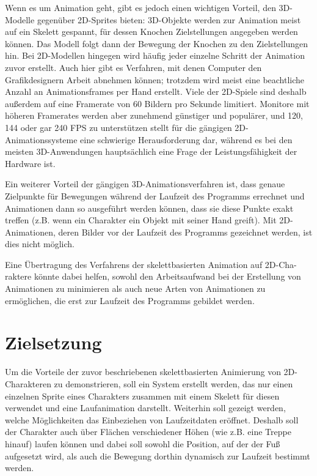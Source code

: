 Wenn es um Animation geht, gibt es jedoch einen wichtigen Vorteil, den 3D-Modelle gegenüber 2D-Sprites bieten: 3D-Objekte werden zur Animation meist auf ein Skelett gespannt, für dessen Knochen Zielstellungen angegeben werden können. Das Modell folgt dann der Bewegung der Knochen zu den Zielstellungen hin. Bei 2D-Modellen hingegen wird häufig jeder einzelne Schritt der Animation zuvor erstellt. Auch hier gibt es Verfahren, mit denen Computer den Grafikdesignern Arbeit abnehmen können; trotzdem wird meist eine beachtliche Anzahl an Animationsframes per Hand erstellt. Viele der 2D-Spiele sind deshalb außerdem auf eine Framerate von 60 Bildern pro Sekunde limitiert. Monitore mit höheren Framerates werden aber zunehmend günstiger und populärer, und 120, 144 oder gar 240 FPS zu unterstützen stellt für die gängigen 2D-Animationssysteme eine schwierige Herausforderung dar, während es bei den meisten 3D-Anwendungen hauptsächlich eine Frage der Leistungsfähigkeit der Hardware ist.

Ein weiterer Vorteil der gängigen 3D-Animationsverfahren ist, dass genaue Zielpunkte für Bewegungen während der Laufzeit des Programms errechnet und Animationen dann so ausgeführt werden können, dass sie diese Punkte exakt treffen (z.B. wenn ein Charakter ein Objekt mit seiner Hand greift). Mit 2D-Animationen, deren Bilder vor der Laufzeit des Programms gezeichnet werden, ist dies nicht möglich.

Eine Übertragung des Verfahrens der skelettbasierten Animation auf 2D-Cha-raktere könnte dabei helfen, sowohl den Arbeitsaufwand bei der Erstellung von Animationen zu minimieren als auch neue Arten von Animationen zu ermöglichen, die erst zur Laufzeit des Programms gebildet werden.

\section{Zielsetzung}
Um die Vorteile der zuvor beschriebenen skelettbasierten Animierung von 2D-Charakteren zu demonstrieren, soll ein System erstellt werden, das nur einen einzelnen Sprite eines Charakters zusammen mit einem Skelett für diesen verwendet und eine Laufanimation darstellt. Weiterhin soll gezeigt werden, welche Möglichkeiten das Einbeziehen von Laufzeitdaten eröffnet. Deshalb soll der Charakter auch über Flächen verschiedener Höhen (wie z.B. eine Treppe hinauf) laufen können und dabei soll sowohl die Position, auf der der Fuß aufgesetzt wird, als auch die Bewegung dorthin dynamisch zur Laufzeit bestimmt werden.

